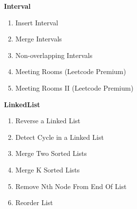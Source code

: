 \documentclass[24pt, a4]{article}
\begin{document}
\begin{multicols}{2}

\textbf{Interval}
\begin{enumerate}
    \item{Insert Interval}
    \item{Merge Intervals}
    \item{Non-overlapping Intervals}
    \item{Meeting Rooms (Leetcode Premium)}
    \item{Meeting Rooms II (Leetcode Premium)}
\end{enumerate}

\columnbreak

\textbf{LinkedList}
\begin{enumerate}
    \item{Reverse a Linked List}
    \item{Detect Cycle in a Linked List}
    \item{Merge Two Sorted Lists}
    \item{Merge K Sorted Lists}
    \item{Remove Nth Node From End Of List}
    \item{Reorder List}
\end{enumerate}

\end{multicols}
\end{document}
